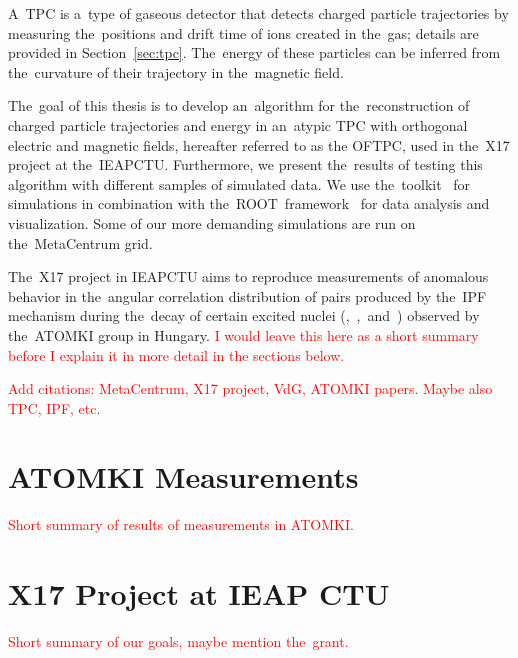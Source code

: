 	A~\ac{TPC} is a~type of gaseous detector that detects charged particle trajectories by measuring the~positions and drift time of ions created in the~gas; details are provided in Section~\ref{sec:tpc}. The~energy of these particles can be inferred from the~curvature of their trajectory in the~magnetic field.
	
	The~goal of this thesis is to develop an~algorithm for the~reconstruction of charged particle trajectories and energy in an~atypic \ac{TPC} with orthogonal electric and magnetic fields, hereafter referred to as the \ac{OFTPC}, used in the~X17 project at the~\ac{IEAPCTU}. Furthermore, we present the~results of testing this algorithm with different samples of simulated data. We use the~\garfieldpp toolkit~\cite{Garfield++} for simulations in combination with the~ROOT~framework~\cite{ROOT} for data analysis and visualization. Some of our more demanding simulations are run on the~MetaCentrum grid.
	
	The~X17 project in \ac{IEAPCTU} aims to reproduce measurements of anomalous behavior in the~angular correlation distribution of pairs produced by the~\ac{IPF} mechanism during the~decay of certain excited nuclei (,~,~and~) observed by the~ATOMKI group in Hungary. \textcolor{red}{I would leave this here as a short summary before I explain it in more detail in the sections below.}
	
	\textcolor{red}{Add citations: MetaCentrum, X17 project, VdG, ATOMKI papers. Maybe also TPC, IPF, etc.}
	
	\section{ATOMKI Measurements}
	\textcolor{red}{Short summary of results of measurements in ATOMKI.}
	
	\section{X17 Project at IEAP CTU}
	\label{sec:IEAP}
		\textcolor{red}{Short summary of our goals, maybe mention the~grant.}